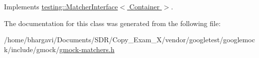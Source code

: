 Implements \hyperlink{classtesting_1_1_matcher_interface_a296b43607cd99d60365f0e6a762777cf}{testing\+::\+Matcher\+Interface$<$ Container $>$}.



The documentation for this class was generated from the following file\+:\begin{DoxyCompactItemize}
\item 
/home/bhargavi/\+Documents/\+S\+D\+R/\+Copy\+\_\+\+Exam\+\_\+X/vendor/googletest/googlemock/include/gmock/\hyperlink{gmock-matchers_8h}{gmock-\/matchers.\+h}\end{DoxyCompactItemize}
